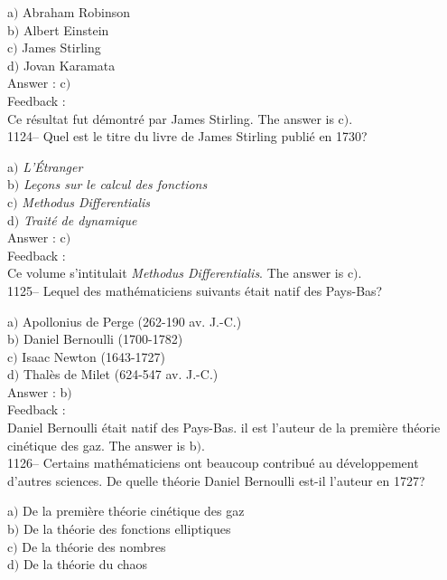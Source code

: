 \documentclass[letterpaper, 12pt]{article}
\begin{document}
a$)$ Abraham Robinson \\
b$)$ Albert Einstein \\
c$)$ James Stirling  \\
d$)$ Jovan Karamata\\

Answer : c$)$\\

Feedback : \\
Ce r\'esultat fut d\'emontr\'e par James Stirling.
The answer is c$)$.\\

1124-- Quel est le titre du livre de James Stirling publi\'e en
1730?

a$)$ {\sl L'\'Etranger} \\
b$)$ {\sl Le\c cons sur le calcul des fonctions}  \\
c$)$ {\sl Methodus Differentialis}  \\
d$)$ {\sl Trait\'e de dynamique} \\

Answer : c$)$\\

Feedback : \\
Ce volume s'intitulait {\sl Methodus Differentialis}.
The answer is c$)$.\\

1125-- Lequel des math\'ematiciens suivants \'etait natif des
Pays-Bas?

a$)$ Apollonius de Perge (262-190 av. J.-C.) \\
b$)$ Daniel Bernoulli (1700-1782) \\
c$)$ Isaac Newton (1643-1727) \\
d$)$ Thal\`es de Milet (624-547 av. J.-C.)\\

Answer : b$)$\\

Feedback : \\
Daniel Bernoulli \'etait natif des Pays-Bas. il est l'auteur de la
premi\`ere th\'eorie cin\'etique des gaz.
The answer is b$)$.\\

1126-- Certains math\'ematiciens ont beaucoup contribu\'e au
d\'eveloppement d'autres sciences. De quelle th\'eorie Daniel
Bernoulli est-il l'auteur en 1727?

a$)$ De la premi\`ere th\'eorie cin\'etique des gaz \\
b$)$ De la th\'eorie des fonctions elliptiques \\
c$)$ De la th\'eorie des nombres \\
d$)$ De la th\'eorie du chaos\\
\end{document}
